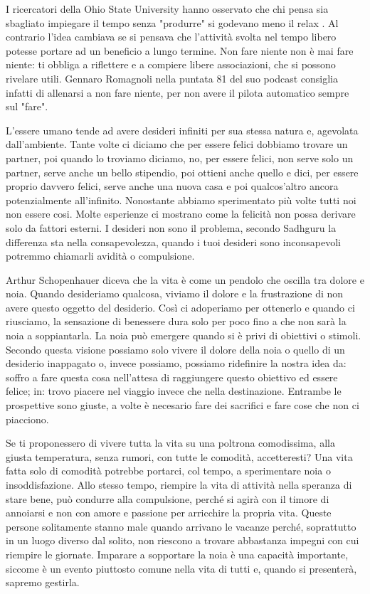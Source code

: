 \documentclass[12pt]{book} %
\begin{document}
\begin{mdframed}[linewidth=1pt]
I ricercatori della Ohio State University hanno osservato che chi pensa sia sbagliato impiegare il tempo senza "produrre" si godevano meno il relax . Al contrario l'idea cambiava se si pensava che l'attività svolta nel tempo libero potesse portare ad un beneficio a lungo termine. Non fare niente non è mai fare niente: ti obbliga a riflettere e a compiere libere associazioni, che si possono rivelare utili. Gennaro Romagnoli nella puntata 81 del suo podcast consiglia infatti di allenarsi a non fare niente, per non avere il pilota automatico sempre sul "fare".
\end{mdframed}

L'essere umano tende ad avere desideri infiniti per sua stessa natura e, agevolata
dall'ambiente. Tante volte ci diciamo che per essere felici dobbiamo trovare un partner, poi
quando lo troviamo diciamo, no, per essere felici, non serve solo un partner, serve anche un bello stipendio, poi
ottieni anche quello e dici, per essere proprio davvero felici, serve anche una nuova casa e poi
qualcos'altro ancora potenzialmente all'infinito. Nonostante abbiamo sperimentato più
volte tutti noi non essere cosi. Molte esperienze ci mostrano come la felicità non possa derivare solo da fattori esterni. I desideri non sono il problema, secondo Sadhguru la differenza sta nella consapevolezza, quando i tuoi
desideri sono inconsapevoli potremmo chiamarli avidità o compulsione. 

Arthur Schopenhauer diceva che la vita è come un pendolo che oscilla tra dolore e noia.
Quando desideriamo qualcosa, viviamo il dolore e la frustrazione di non avere questo oggetto del desiderio. Così
ci adoperiamo per ottenerlo e quando ci riusciamo, la sensazione di benessere dura solo per poco fino a che non sarà la noia a soppiantarla. La noia può emergere quando si è privi di obiettivi o stimoli.
Secondo questa visione possiamo solo vivere il dolore della noia o quello di un desiderio inappagato o, invece
possiamo, possiamo ridefinire la nostra idea da: soffro a fare questa cosa nell'attesa di raggiungere questo obiettivo ed essere felice; in: trovo piacere nel viaggio invece che nella destinazione. Entrambe le prospettive sono giuste, a volte è necesario fare dei sacrifici e fare cose che non ci piacciono. 

Se ti proponessero di vivere tutta la vita su una poltrona
comodissima, alla giusta temperatura, senza rumori, con tutte le comodità, accetteresti? 
Una vita fatta solo di comodità potrebbe portarci, col tempo, a sperimentare noia o insoddisfazione. Allo stesso tempo, riempire la vita di attività nella speranza di stare bene, può condurre alla compulsione, perché si agirà con il timore di annoiarsi e non con amore e passione per arricchire la propria vita. Queste persone solitamente stanno male quando arrivano le vacanze perché, soprattutto in un luogo diverso dal solito, non riescono a trovare abbastanza impegni con cui riempire le giornate. Imparare a sopportare la noia è una capacità importante, siccome è un evento piuttosto comune nella vita di tutti e, quando si presenterà, sapremo gestirla.
\end{document}
